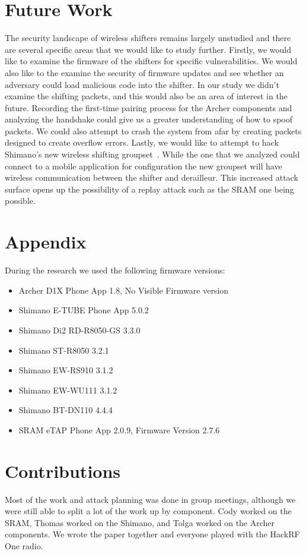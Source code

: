 \documentclass[letterpaper,twocolumn,10pt]{article}
\begin{document}
\section{Future Work}

The security landscape of wireless shifters remains largely unstudied and there are several specific areas that we would like to study further. Firstly, we would like to examine the firmware of the shifters for specific vulnerabilities. We would also like to the examine the security of firmware updates and see whether an adversary could load malicious code into the shifter. In our study we didn’t examine the shifting packets, and this would also be an area of interest in the future. Recording the first-time pairing process for the Archer components and analyzing the handshake could give us a greater understanding of how to spoof packets. We could also attempt to crash the system from afar by creating packets designed to create overflow errors. Lastly, we would like to attempt to hack Shimano’s new wireless shifting groupset~\cite{newshimano}. While the one that we analyzed could connect to a mobile application for configuration the new groupset will have wireless communication between the shifter and derailleur. This increased attack surface opens up the possibility of a replay attack such as the SRAM one being possible.


  {\normalsize 
    }


\section{Appendix}
During the research we used the following firmware versions:
\begin{itemize}
  \item Archer D1X Phone App 1.8, No Visible Firmware version
  \item Shimano E-TUBE Phone App 5.0.2
  \item Shimano Di2 RD-R8050-GS 3.3.0
  \item Shimano ST-R8050 3.2.1
  \item Shimano EW-RS910 3.1.2
  \item Shimano EW-WU111 3.1.2
  \item Shimano BT-DN110 4.4.4 
  \item SRAM eTAP Phone App 2.0.9, Firmware Version 2.7.6
\end{itemize}
\section{Contributions}

Most of the work and attack planning was done in group meetings, although we were still able to split a lot of the work up by component. Cody worked on the SRAM, Thomas worked on the Shimano, and Tolga worked on the Archer components. We wrote the paper together and everyone played with the HackRF One radio.

\end{document}
